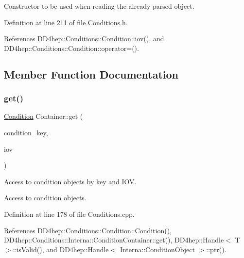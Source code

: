 Constructor to be used when reading the already parsed object. 



Definition at line 211 of file Conditions.\+h.



References D\+D4hep\+::\+Conditions\+::\+Condition\+::iov(), and D\+D4hep\+::\+Conditions\+::\+Condition\+::operator=().



\subsection{Member Function Documentation}
\hypertarget{class_d_d4hep_1_1_conditions_1_1_container_af456b3ae43eea6491b6aa9b128faab66}{}\label{class_d_d4hep_1_1_conditions_1_1_container_af456b3ae43eea6491b6aa9b128faab66} 
\subsubsection{\texorpdfstring{get()}{get()}\hspace{0.1cm}{\footnotesize\ttfamily [1/4]}}
{\footnotesize\ttfamily \hyperlink{class_d_d4hep_1_1_conditions_1_1_condition}{Condition} Container\+::get (\begin{DoxyParamCaption}\item[{const std\+::string \&}]{condition\+\_\+key,  }\item[{const \hyperlink{class_d_d4hep_1_1_conditions_1_1_container_a169b09fd183c9e05faf63429bad6c668}{iov\+\_\+type} \&}]{iov }\end{DoxyParamCaption})}



Access to condition objects by key and \hyperlink{class_d_d4hep_1_1_i_o_v}{I\+OV}. 

Access to condition objects. 

Definition at line 178 of file Conditions.\+cpp.



References D\+D4hep\+::\+Conditions\+::\+Condition\+::\+Condition(), D\+D4hep\+::\+Conditions\+::\+Interna\+::\+Condition\+Container\+::get(), D\+D4hep\+::\+Handle$<$ T $>$\+::is\+Valid(), and D\+D4hep\+::\+Handle$<$ Interna\+::\+Condition\+Object $>$\+::ptr().

\hypertarget{class_d_d4hep_1_1_conditions_1_1_container_a1b9bfc1fd9fbb6953f1b1cf682263cc5}{}\label{class_d_d4hep_1_1_conditions_1_1_container_a1b9bfc1fd9fbb6953f1b1cf682263cc5} 
